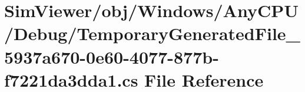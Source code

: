 \hypertarget{_sim_viewer_2obj_2_windows_2_any_c_p_u_2_debug_2_temporary_generated_file__5937a670-0e60-4077-877b-f7221da3dda1_8cs}{}\section{Sim\+Viewer/obj/\+Windows/\+Any\+C\+P\+U/\+Debug/\+Temporary\+Generated\+File\+\_\+5937a670-\/0e60-\/4077-\/877b-\/f7221da3dda1.cs File Reference}
\label{_sim_viewer_2obj_2_windows_2_any_c_p_u_2_debug_2_temporary_generated_file__5937a670-0e60-4077-877b-f7221da3dda1_8cs}
